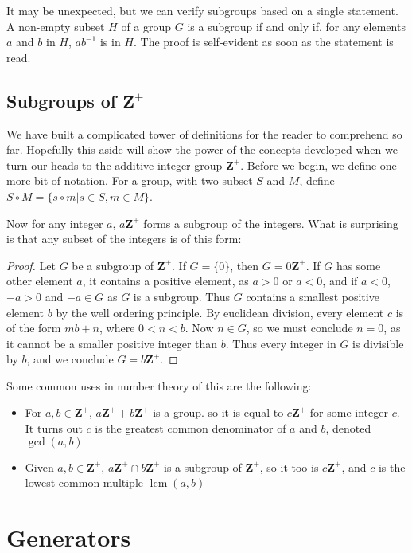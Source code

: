 \documentclass{report}
\DeclareMathOperator{\lcm}{lcm}
\begin{document}
It may be unexpected, but we can verify subgroups based on a single statement. A non-empty subset $H$ of a group $G$ is a subgroup if and only if, for any elements $a$ and $b$ in $H$, $ab^{-1}$ is in $H$. The proof is self-evident as soon as the statement is read.

\subsection{Subgroups of $\mathbf{Z}^+$}

We have built a complicated tower of definitions for the reader to comprehend so far. Hopefully this aside will show the power of the concepts developed when we turn our heads to the additive integer group $\mathbf{Z}^+$. Before we begin, we define one more bit of notation. For a group, with two subset $S$ and $M$, define $S \circ M = \{ s \circ m | s \in S, m \in M \}$.

Now for any integer $a$, $a\mathbf{Z}^+$ forms a subgroup of the integers. What is surprising is that any subset of the integers is of this form:
\begin{proof}
    Let $G$ be a subgroup of $\mathbf{Z}^+$. If $G = \{ 0 \}$, then $G = 0\mathbf{Z}^+$. If $G$ has some other element $a$, it contains a positive element, as $a > 0$ or $a < 0$, and if $a < 0$, $-a > 0$ and $-a \in G$ as $G$ is a subgroup. Thus $G$ contains a smallest positive element $b$ by the well ordering principle. By euclidean division, every element $c$ is of the form $mb + n$, where $0 < n < b$. Now $n \in G$, so we must conclude $n = 0$, as it cannot be a smaller positive integer than $b$. Thus every integer in $G$ is divisible by $b$, and we conclude $G = b\mathbf{Z}^+$.
\end{proof}

Some common uses in number theory of this are the following:
\begin{itemize}
    \item For $a, b \in \mathbf{Z}^+$, $a\mathbf{Z}^+ + b\mathbf{Z}^+$ is a group. so it is equal to $c\mathbf{Z}^+$ for some integer $c$. It turns out $c$ is the greatest common denominator of $a$ and $b$, denoted $\gcd(a,b)$
    \item Given $a,b \in \mathbf{Z}^+$, $a\mathbf{Z}^+ \cap b\mathbf{Z}^+$ is a subgroup of $\mathbf{Z}^+$, so it too is $c\mathbf{Z}^+$, and $c$ is the lowest common multiple $\lcm(a,b)$
\end{itemize}

\section{Generators}
\end{document}
